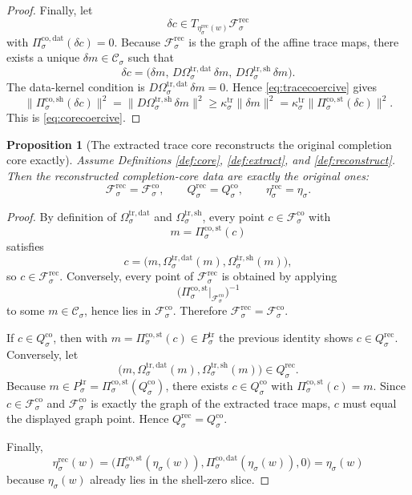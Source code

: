 \documentclass[11pt]{article}
\newcommand{\CoreState}[1]{\mathcal C_{#1}}
\newcommand{\CoreAffine}[1]{\mathcal F_{#1}^{\mathrm{co}}}
\newcommand{\CoreBody}[1]{Q_{#1}^{\mathrm{co}}}
\newcommand{\CoreStateProj}[1]{\Pi_{#1}^{\mathrm{co,st}}}
\newcommand{\CoreDataProj}[1]{\Pi_{#1}^{\mathrm{co,dat}}}
\newcommand{\CoreShellProj}[1]{\Pi_{#1}^{\mathrm{co,sh}}}
\newcommand{\CoreEmbed}[1]{\eta_{#1}}
\newcommand{\TraceBody}[1]{P_{#1}^{\mathrm{tr}}}
\newcommand{\TraceDataMap}[1]{\Omega_{#1}^{\mathrm{tr,dat}}}
\newcommand{\TraceShellMap}[1]{\Omega_{#1}^{\mathrm{tr,sh}}}
\newcommand{\RecAffine}[1]{\mathcal F_{#1}^{\mathrm{rec}}}
\newcommand{\RecBody}[1]{Q_{#1}^{\mathrm{rec}}}
\newcommand{\RecEmbed}[1]{\eta_{#1}^{\mathrm{rec}}}
\newtheorem{proposition}{Proposition}
\begin{document}
\begin{proof}
Finally, let
\[
\delta c\in T_{\RecEmbed{\sigma}(w)}\RecAffine{\sigma}
\]
with \(\CoreDataProj{\sigma}(\delta c)=0\). Because \(\RecAffine{\sigma}\) is the graph of the affine trace maps, there exists a unique \(\delta m\in\CoreState{\sigma}\) such that
\[
\delta c=
\bigl(
\delta m,\,
D\TraceDataMap{\sigma}\,\delta m,\,
D\TraceShellMap{\sigma}\,\delta m
\bigr).
\]
The data-kernel condition is \(D\TraceDataMap{\sigma}\,\delta m=0\). Hence \eqref{eq:tracecoercive} gives
\[
\bigl\|
\CoreShellProj{\sigma}(\delta c)
\bigr\|^{2}
=
\bigl\|
D\TraceShellMap{\sigma}\,\delta m
\bigr\|^{2}
\ge
\kappa_{\sigma}^{\mathrm{tr}}\|\delta m\|^{2}
=
\kappa_{\sigma}^{\mathrm{tr}}
\bigl\|
\CoreStateProj{\sigma}(\delta c)
\bigr\|^{2}.
\]
This is \eqref{eq:corecoercive}.
\end{proof}

\begin{proposition}[The extracted trace core reconstructs the original completion core exactly]
\label{prop:exact}
Assume Definitions \ref{def:core}, \ref{def:extract}, and \ref{def:reconstruct}. Then the reconstructed completion-core data are exactly the original ones:
\[
\RecAffine{\sigma}=\CoreAffine{\sigma},
\qquad
\RecBody{\sigma}=\CoreBody{\sigma},
\qquad
\RecEmbed{\sigma}=\CoreEmbed{\sigma}.
\]
\end{proposition}

\begin{proof}
By definition of \(\TraceDataMap{\sigma}\) and \(\TraceShellMap{\sigma}\), every point \(c\in\CoreAffine{\sigma}\) with
\[
m=\CoreStateProj{\sigma}(c)
\]
satisfies
\[
c=
\bigl(
m,\TraceDataMap{\sigma}(m),\TraceShellMap{\sigma}(m)
\bigr),
\]
so \(c\in\RecAffine{\sigma}\). Conversely, every point of \(\RecAffine{\sigma}\) is obtained by applying
\[
\bigl(
\CoreStateProj{\sigma}\big|_{\CoreAffine{\sigma}}
\bigr)^{-1}
\]
to some \(m\in\CoreState{\sigma}\), hence lies in \(\CoreAffine{\sigma}\). Therefore \(\RecAffine{\sigma}=\CoreAffine{\sigma}\).

If \(c\in\CoreBody{\sigma}\), then with \(m=\CoreStateProj{\sigma}(c)\in\TraceBody{\sigma}\) the previous identity shows \(c\in\RecBody{\sigma}\). Conversely, let
\[
\bigl(
m,\TraceDataMap{\sigma}(m),\TraceShellMap{\sigma}(m)
\bigr)\in\RecBody{\sigma}.
\]
Because \(m\in\TraceBody{\sigma}=\CoreStateProj{\sigma}(\CoreBody{\sigma})\), there exists \(c\in\CoreBody{\sigma}\) with \(\CoreStateProj{\sigma}(c)=m\). Since \(c\in\CoreAffine{\sigma}\) and \(\CoreAffine{\sigma}\) is exactly the graph of the extracted trace maps, \(c\) must equal the displayed graph point. Hence \(\RecBody{\sigma}=\CoreBody{\sigma}\).

Finally,
\[
\RecEmbed{\sigma}(w)
=
\bigl(
\CoreStateProj{\sigma}(\CoreEmbed{\sigma}(w)),
\CoreDataProj{\sigma}(\CoreEmbed{\sigma}(w)),
0
\bigr)
=
\CoreEmbed{\sigma}(w)
\]
because \(\CoreEmbed{\sigma}(w)\) already lies in the shell-zero slice.
\end{proof}
\end{document}
